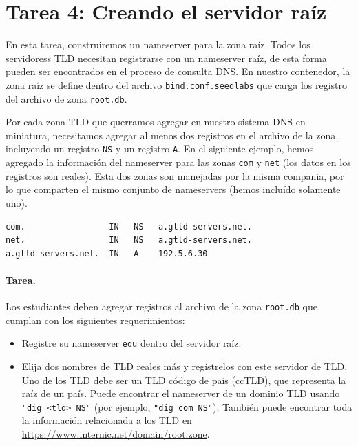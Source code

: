 \section{Tarea 4: Creando el servidor raíz}

En esta tarea, construiremos un nameserver para la zona raíz. Todos los servidoress TLD necesitan registrarse con un nameserver raíz, de esta forma pueden ser encontrados en el proceso de consulta DNS.
En nuestro contenedor, la zona raíz se define dentro del archivo \texttt{bind.conf.seedlabs} que carga los registro del archivo de zona \texttt{root.db}. 

Por cada zona TLD que querramos agregar en nuestro sistema DNS en miniatura, necesitamos agregar al menos dos registros en el archivo de la zona, incluyendo un registro  \texttt{NS} y un registro \texttt{A}. En el siguiente ejemplo, hemos agregado la información del nameserver para las zonas \texttt{com} y \texttt{net} (los datos en los registros son reales).
Esta dos zonas son manejadas por la misma compania, por lo que comparten el mismo conjunto de nameservers (hemos incluído solamente uno).

\begin{lstlisting}
com.                 IN   NS   a.gtld-servers.net.
net.                 IN   NS   a.gtld-servers.net.
a.gtld-servers.net.  IN   A    192.5.6.30
\end{lstlisting}
 

\paragraph{Tarea.} Los estudiantes deben agregar registros al archivo de la zona \texttt{root.db} que cumplan con los siguientes requerimientos:


\begin{itemize}[nosep]

\item Registre su nameserver \texttt{edu} dentro del servidor raíz.

\item Elija dos nombres de TLD reales más y regístrelos con este servidor de TLD. Uno de los TLD debe ser un TLD código de país (ccTLD), que representa la raíz de un país. Puede encontrar el nameserver de un dominio TLD usando \texttt{"dig <tld> NS"} (por ejemplo, \texttt{"dig com NS"}).
También puede encontrar toda la información relacionada a los TLD en \url{https://www.internic.net/domain/root.zone}.
\end{itemize}
 
